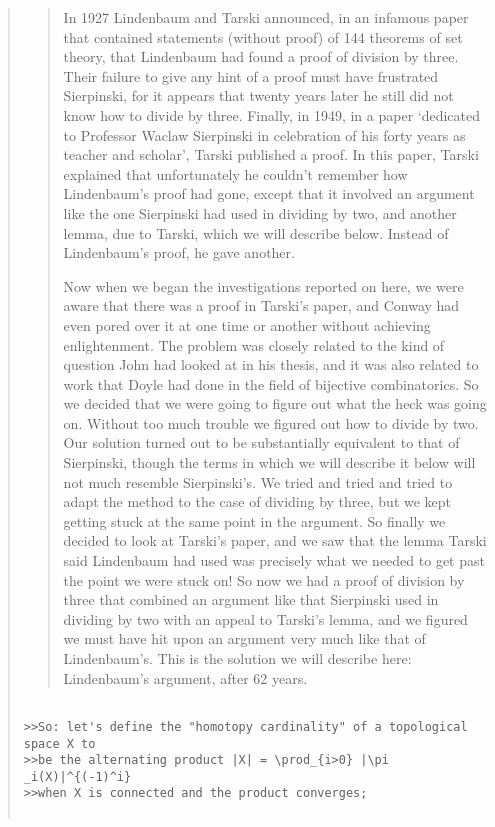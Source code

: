 \begin{quote}
\begin{quote}
In 1927 Lindenbaum and Tarski announced, in an infamous paper that
contained statements (without proof) of 144 theorems of set theory, that
Lindenbaum had found a proof of division by three. Their failure to give any
hint of a proof must have frustrated Sierpinski, for it appears that twenty
years later he still did not know how to divide by three.  Finally,
in 1949, in a paper `dedicated to Professor Waclaw Sierpinski in celebration
of his forty years as teacher and scholar', Tarski published a proof.
In this paper, Tarski explained that unfortunately he couldn't remember how
Lindenbaum's proof had gone, except that it involved an argument like the
one Sierpinski had used in dividing by two, and another lemma, due to
Tarski, which we will describe below. Instead of Lindenbaum's proof, he gave
another.

Now when we began the investigations reported on here, we were aware that
there was a proof in Tarski's paper, and Conway had even pored over it at
one time or another without achieving enlightenment. The problem was closely
related to the kind of question John had looked at in his thesis, and it was
also related to work that Doyle had done in the field of bijective
combinatorics. So we decided that we were going to figure out what the heck
was going on. Without too much trouble we figured out how to divide by two.
Our solution turned out to be substantially equivalent to that of
Sierpinski, though the terms in which we will describe it below will not
much resemble Sierpinski's. We tried and tried and tried to adapt the method
to the case of dividing by three, but we kept getting stuck at the same
point in the argument. So finally we decided to look at Tarski's paper, and
we saw that the lemma Tarski said Lindenbaum had used was precisely what we
needed to get past the point we were stuck on! So now we had a proof of
division by three that combined an argument like that Sierpinski used in
dividing by two with an appeal to Tarski's lemma, and we figured we must
have hit upon an argument very much like that of Lindenbaum's. This is the
solution we will describe here: Lindenbaum's argument, after 62 years.
\end{quote}


\begin{verbatim}

>>So: let's define the "homotopy cardinality" of a topological space X to
>>be the alternating product |X| = \prod_{i>0} |\pi _i(X)|^{(-1)^i}
>>when X is connected and the product converges;


\end{verbatim}
\end{quote}
